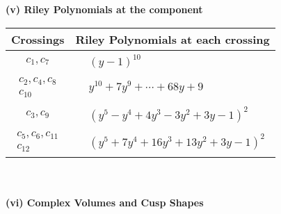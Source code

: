 \documentclass[1p]{elsarticle_modified}
\theoremstyle{definition}
\begin{document}
\newpage\renewcommand{\arraystretch}{1}
\flushleft \textbf{(v) Riley Polynomials at the component}\newline \\
\begin{tabular}{m{50pt}|m{274pt}}
Crossings & \hspace{64pt}Riley Polynomials at each crossing \\
\hline $$\begin{aligned}c_{1},c_{7}\end{aligned}$$&$\begin{aligned}
&(y-1)^{10}
\end{aligned}$\\
\hline $$\begin{aligned}c_{2},c_{4},c_{8}\\c_{10}\end{aligned}$$&$\begin{aligned}
&y^{10}+7 y^9+\cdots+68 y+9
\end{aligned}$\\
\hline $$\begin{aligned}c_{3},c_{9}\end{aligned}$$&$\begin{aligned}
&(y^5- y^4+4 y^3-3 y^2+3 y-1)^2
\end{aligned}$\\
\hline $$\begin{aligned}c_{5},c_{6},c_{11}\\c_{12}\end{aligned}$$&$\begin{aligned}
&(y^5+7 y^4+16 y^3+13 y^2+3 y-1)^2
\end{aligned}$\\
\hline
\end{tabular}\\~\\
\newpage\flushleft \textbf{(vi) Complex Volumes and Cusp Shapes}
\end{document}
